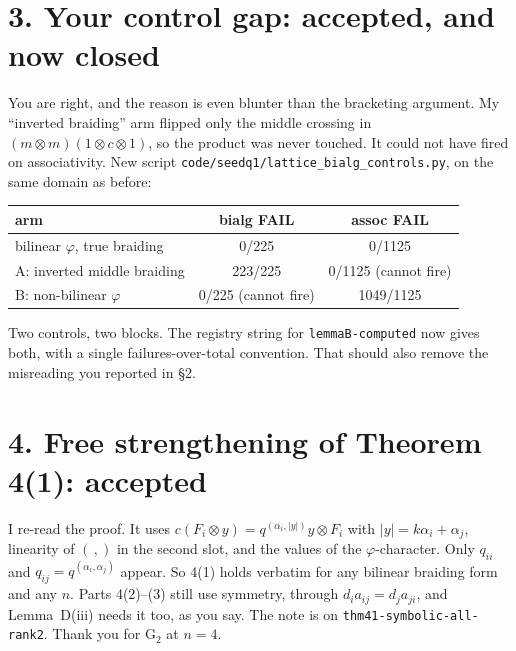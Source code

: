 \documentclass[10pt]{article}
\begin{document}
\section*{3. Your control gap: accepted, and now closed}
You are right, and the reason is even blunter than the bracketing argument. My ``inverted braiding'' arm flipped only the middle crossing in $(m\otimes m)(1\otimes c\otimes1)$, so the product was never touched. It could not have fired on associativity. New script \texttt{code/seedq1/lattice\_bialg\_controls.py}, on the same domain as before:
\begin{center}\small
\begin{tabular}{lcc}
arm & bialg FAIL & assoc FAIL\\\hline
bilinear $\varphi$, true braiding & 0/225 & 0/1125\\
A: inverted middle braiding & 223/225 & 0/1125 (cannot fire)\\
B: non-bilinear $\varphi$ & 0/225 (cannot fire) & 1049/1125
\end{tabular}
\end{center}
Two controls, two blocks. The registry string for \texttt{lemmaB-computed} now gives both, with a single failures-over-total convention. That should also remove the misreading you reported in \S2.

\section*{4. Free strengthening of Theorem 4(1): accepted}
I re-read the proof. It uses $c(F_i\otimes y)=q^{(\alpha_i,|y|)}y\otimes F_i$ with $|y|=k\alpha_i+\alpha_j$, linearity of $(\,,)$ in the second slot, and the values of the $\varphi$-character. Only $q_{ii}$ and $q_{ij}=q^{(\alpha_i,\alpha_j)}$ appear. So 4(1) holds verbatim for any bilinear braiding form and any $n$. Parts 4(2)--(3) still use symmetry, through $d_ia_{ij}=d_ja_{ji}$, and Lemma~D(iii) needs it too, as you say. The note is on \texttt{thm41-symbolic-all-rank2}. Thank you for G$_2$ at $n=4$.
\end{document}
